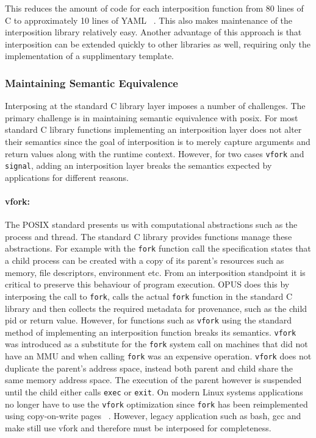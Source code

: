 \documentclass[withindex,glossary]{cam-thesis}
\begin{document}
This reduces the amount of code for each interposition function from 80 lines of C to approximately 10 lines of YAML ~\cite{YAML}.
This also makes maintenance of the interposition library relatively easy.
Another advantage of this approach is that interposition can be extended quickly to other libraries as well, requiring only the implementation of a supplimentary template.

\subsubsection{Maintaining Semantic Equivalence}
Interposing at the standard C library layer imposes a number of challenges.
The primary challenge is in maintaining semantic equivalence with posix.
For most standard C library functions implementing an interposition layer does not alter their semantics since the goal of interposition is to merely capture arguments and return values along with the runtime context.
However, for two cases \texttt{vfork} and \texttt{signal}, adding an interposition layer breaks the semantics expected by applications for different reasons.

\paragraph{vfork:}
The POSIX standard presents us with computational abstractions such as the process and thread.
The standard C library provides functions manage these abstractions.
For example with the \texttt{fork} function call the specification states that a child process can be created with a copy of its parent's resources such as memory, file descriptors, environment etc.
From an interposition standpoint it is critical to preserve this behaviour of program execution.
OPUS does this by interposing the call to \texttt{fork}, calls the actual \texttt{fork} function in the standard C library and then collects the required metadata for provenance, such as the child pid or return value.
However, for functions such as \texttt{vfork} using the standard method of implementing an interposition function breaks its semantics.
\texttt{vfork} was introduced as a substitute for the \texttt{fork} system call on machines that did not have an MMU and when calling \texttt{fork} was an expensive operation.
\texttt{vfork} does not duplicate the parent's address space, instead both parent and child share the same memory address space.
The execution of the parent however is suspended until the child either calls \texttt{exec} or \texttt{exit}.
On modern Linux systems applications no longer have to use the \texttt{vfork} optimization since \texttt{fork} has been reimplemented using copy-on-write pages ~\cite{robertlove}.
However, legacy application such as bash, gcc and make still use vfork and therefore must be interposed for completeness.
\end{document}
